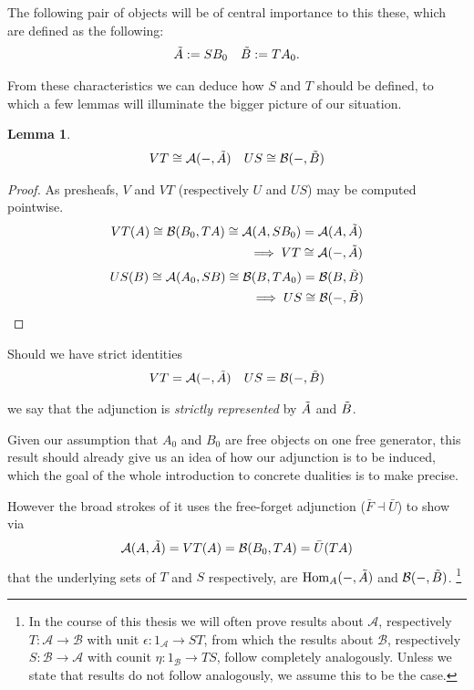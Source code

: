 \documentclass[12pt,a4paper]{article}
\newtheorem{lemma}{Lemma}[section] %
\DeclareMathOperator{\Hom}{Hom}
\def\HomA{\ensuremath\mathcal{A}}
\def\HomB{\ensuremath\mathcal{B}}
\def\t{\ensuremath\tilde}
\begin{document}
The following pair of objects will be of central importance to this these, which are defined as the following:
\begin{align*}
	\t A := SB_0&&
	\t B := TA_0.
\end{align*}


From these characteristics we can deduce how $S$ and $T$ should be defined, to which a few lemmas will illuminate the bigger picture of our situation.
\begin{lemma}
\begin{align*}
		VT \cong \HomA(-, \t  A)&&
	US \cong \HomB(-, \t  B)\\
\end{align*}
\end{lemma}
\begin{proof}
As presheafs, $V$ and $VT$ (respectively $U$ and $US$) may be computed pointwise. 
\begin{align*}
	VT(A) \cong \HomB(B_0, TA) \cong \HomA(A,SB_0) = \HomA(A, \t A) \\
	\implies VT \cong \HomA(-, \t A)
\end{align*}
\begin{align*}
	US(B) \cong  \HomA(A_0, SB) \cong  \HomB(B,TA_0) =  \HomB(B, \t B) \\
	\implies US \cong \HomB(-, \t B)
\end{align*}
\end{proof}
Should we have strict identities
\begin{align*}
		VT = \HomA(-, \t  A)&&
	US = \HomB(-, \t  B)\\
\end{align*} 

we say that the adjunction is \emph{strictly represented} by $\t A$ and $\t B$. 

Given our assumption that $A_0$ and $B_0$ are free objects on one free generator, this result should already give us an idea of how our adjunction is to be induced, which the goal of the whole introduction to concrete dualities is to make precise. 

However the broad strokes of it uses the free-forget  adjunction ($\bar F \dashv \bar U$)  to show via \begin{align*}
	\HomA(A, \t A) = VT(A) = \HomB(B_0, T A) = \bar U(TA)
\end{align*} 
that the underlying sets of $T$ and $S$ respectively, are $\Hom_A(-, \t A)$ and $\HomB(-, \t B)$. \footnote{In the course of this thesis we will often prove results about $\mathcal{A}$, respectively $T: \mathcal{A}\to \mathcal{B}$ with unit $\epsilon:1_\mathcal{A} \to ST $, from which the results about $\mathcal{B}$, respectively $S: \mathcal{B} \to \mathcal{A}$ with counit $\eta: 1_\mathcal{B} \to TS$, follow completely analogously. Unless we state that results do not follow analogously, we assume this to be the case.}
\end{document}
